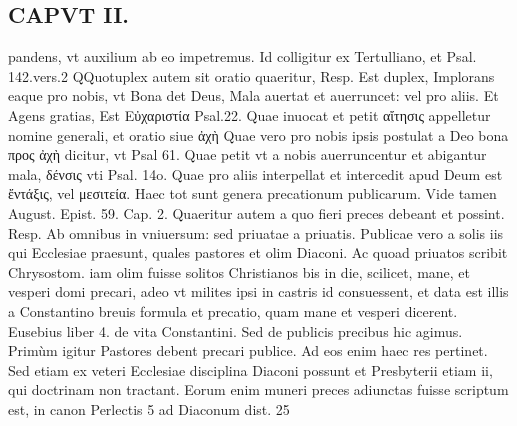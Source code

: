\documentclass{article}
\begin{document}
\begin{pages}
\section*{CAPVT II. }
\marginpar{[ p.43 ]}\pstart pandens, vt auxilium ab eo impetremus. Id colligitur ex Tertulliano, et Psal. 142.vers.2  \pend\pstart QQuotuplex autem sit oratio quaeritur, Resp. Est duplex, Implorans eaque  pro nobis, vt Bona det Deus, Mala auertat et auerruncet: vel pro aliis. Et Agens gratias, Est Εὐχαριστία Psal.22.  \pend\pstart Quae inuocat et petit αἴτησις appelletur nomine generali, et oratio siue ἀχὴ  Quae vero pro nobis ipsis postulat a Deo bona προς ἀχὴ  dicitur, vt Psal 61. Quae petit vt a nobis auerruncentur et abigantur mala, δένσις vti Psal. 14o.  \pend\pstart Quae pro aliis interpellat et intercedit apud Deum est ἔντάξις, vel μεσιτεία. Haec tot sunt genera precationum publicarum. Vide tamen August. Epist. 59.  \pend\pstart Cap. 2. Quaeritur autem a quo fieri preces debeant et possint. Resp. Ab omnibus in vniuersum: sed priuatae a priuatis. Publicae vero a solis iis qui Ecclesiae praesunt, quales pastores et olim Diaconi. Ac quoad priuatos scribit Chrysostom. iam olim fuisse solitos Christianos bis in die, scilicet, mane, et vesperi domi precari, adeo vt milites ipsi in castris id consuessent, et data est illis a Constantino breuis formula et precatio, quam mane et vesperi dicerent. Eusebius liber 4. de vita Constantini. Sed de publicis precibus hic agimus.  \pend\pstart Primùm igitur Pastores debent precari publice. Ad eos enim haec res pertinet. Sed etiam ex veteri Ecclesiae disciplina Diaconi possunt et Presbyterii etiam ii, qui doctrinam non tractant. Eorum enim muneri preces adiunctas fuisse scriptum est, in canon Perlectis 5 ad Diaconum dist. 25  \pend

\end{pages}
\end{document}
